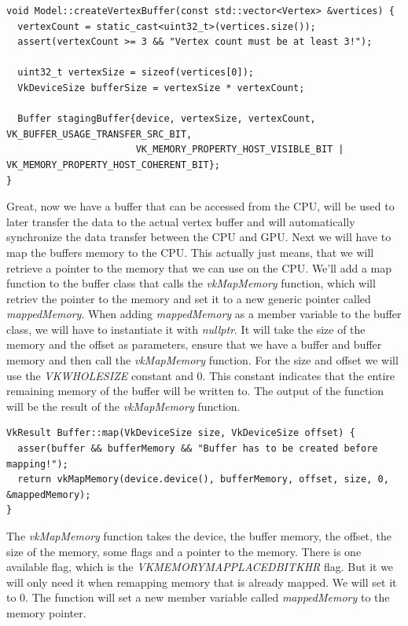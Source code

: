 \documentclass[12pt]{report} \usepackage{preamble}
\begin{document}
\begin{lstlisting}[Language=C++]
void Model::createVertexBuffer(const std::vector<Vertex> &vertices) {
  vertexCount = static_cast<uint32_t>(vertices.size());
  assert(vertexCount >= 3 && "Vertex count must be at least 3!");

  uint32_t vertexSize = sizeof(vertices[0]);
  VkDeviceSize bufferSize = vertexSize * vertexCount;

  Buffer stagingBuffer{device, vertexSize, vertexCount, VK_BUFFER_USAGE_TRANSFER_SRC_BIT, 
                       VK_MEMORY_PROPERTY_HOST_VISIBLE_BIT | VK_MEMORY_PROPERTY_HOST_COHERENT_BIT};
}
\end{lstlisting}

Great, now we have a buffer that can be accessed from the CPU, will be used to later transfer the data to the actual vertex buffer and will automatically synchronize the data transfer between the CPU and GPU.
Next we will have to map the buffers memory to the CPU. This actually just means, that we will retrieve a pointer to the memory that we can use on the CPU.
We'll add a map function to the buffer class that calls the \textit{vkMapMemory} function, which will retriev the pointer to the memory and set it to a new generic pointer called \textit{mappedMemory}.
When adding \textit{mappedMemory} as a member variable to the buffer class, we will have to instantiate it with \textit{nullptr}.
It will take the size of the memory and the offset as parameters,
ensure that we have a buffer and buffer memory and then call the \textit{vkMapMemory} function. For the size and offset we will use the \textit{VK\textunderscore WHOLE\textunderscore SIZE} constant and 0.
This constant indicates that the entire remaining memory of the buffer will be written to. The output of the function will be the result of the \textit{vkMapMemory} function.

\begin{lstlisting}[Language=C++]
VkResult Buffer::map(VkDeviceSize size, VkDeviceSize offset) {
  asser(buffer && bufferMemory && "Buffer has to be created before mapping!");
  return vkMapMemory(device.device(), bufferMemory, offset, size, 0, &mappedMemory);
}
\end{lstlisting}

The \textit{vkMapMemory} function takes the device, the buffer memory, the offset, the size of the memory, some flags and a pointer to the memory.
There is one available flag, which is the \textit{VK\textunderscore MEMORY\textunderscore MAP\textunderscore PLACED\textunderscore BIT\textunderscore KHR} flag.
But it we will only need it when remapping memory that is already mapped. We will set it to 0. The function will set a new member variable called \textit{mappedMemory} to the memory pointer.
\end{document}
